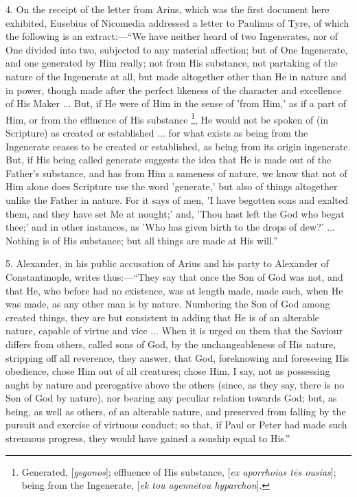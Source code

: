 4. On the receipt of the letter from Arius, which was the first
document here exhibited, Eusebius of Nicomedia addressed a letter to
Paulinus of Tyre, of which the following is an extract:—``We
have neither heard of two Ingenerates, nor of One divided into two,
subjected to any material affection; but of One Ingenerate, and one
generated by Him really; not from His substance, not partaking of the
nature of the Ingenerate at all, but made altogether other than He in
nature and in power, though made after the perfect likeness of
the character and excellence of His Maker ... But, if He were of Him
in the sense of 'from Him,' as if a part of Him, or from the effluence
of His substance \footnote{Generated, [\emph{gegonos}]; effluence of
His substance, [\emph{ex aporrhoias t\={e}s ousias}]; being from
the Ingenerate, [\emph{ek tou agenn\={e}tou hyparchon}].}, He
would not be spoken of (in Scripture) as created or established ...
for what exists as being from the Ingenerate ceases to be created or
established, as being from its origin ingenerate. But, if His being
called generate suggests the idea that He is made out of the Father's
substance, and has from Him a sameness of nature, we know that not of
Him alone does Scripture use the word 'generate,' but also of things
altogether unlike the Father in nature. For it says of men, 'I have
begotten sons and exalted them, and they have set Me at nought;' and,
'Thou hast left the God who begat thee;' and in other instances, as
'Who has given birth to the drops of dew?' ... Nothing is of His
substance; but all things are made at His will.''

5. Alexander, in his public accusation of Arius and his party to
Alexander of Constantinople, writes thus:—``They say that once
the Son of God was not, and that He, who before had no existence, was
at length made, made such, when He was made, as any other man is by
nature. Numbering the Son of God among created things, they are but
consistent in adding that He is of an alterable nature, capable of
virtue and vice ... When it is urged on them that the Saviour differs
from others, called sons of God, by the unchangeableness of His
nature, stripping off all reverence, they answer, that God, foreknowing and foreseeing His obedience, chose Him out of all
creatures; chose Him, I say, not as possessing aught by nature and
prerogative above the others (since, as they say, there is no Son of
God by nature), nor bearing any peculiar relation towards God; but, as
being, as well as others, of an alterable nature, and preserved from
falling by the pursuit and exercise of virtuous conduct; so that, if
Paul or Peter had made such strenuous progress, they would have gained
a sonship equal to His.''

